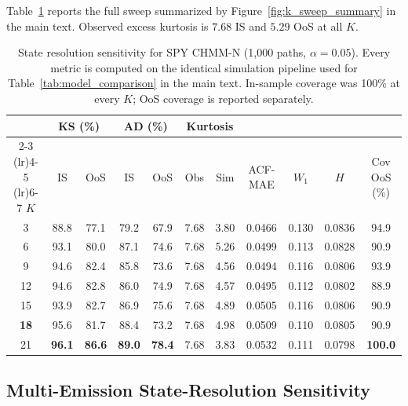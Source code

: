 Table~\ref{tab:sensitivity} reports the full sweep summarized by Figure~\ref{fig:k_sweep_summary} in the main text.
Observed excess kurtosis is $7.68$ IS and $5.29$ OoS at all $K$.

\begin{table}[H]
\centering
\caption{State resolution sensitivity for SPY CHMM-N (1{,}000 paths, $\alpha = 0.05$). Every metric is computed on the identical simulation pipeline used for Table~\ref{tab:model_comparison} in the main text. In-sample coverage was 100\% at every $K$; OoS coverage is reported separately.}
\label{tab:sensitivity}
\small
\begin{tabular}{c cc cc cc c c c c}
\toprule
& \multicolumn{2}{c}{KS (\%)} & \multicolumn{2}{c}{AD (\%)} & \multicolumn{2}{c}{Kurtosis} & & & & \\
\cmidrule(lr){2-3} \cmidrule(lr){4-5} \cmidrule(lr){6-7}
$K$ & IS & OoS & IS & OoS & Obs & Sim & ACF-MAE & $W_1$ & $H$ & Cov OoS (\%) \\
\midrule
3  & 88.8 & 77.1 & 79.2 & 67.9 & 7.68 & 3.80 & 0.0466 & 0.130 & 0.0836 & 94.9 \\
6  & 93.1 & 80.0 & 87.1 & 74.6 & 7.68 & 5.26 & 0.0499 & 0.113 & 0.0828 & 90.9 \\
9  & 94.6 & 82.4 & 85.8 & 73.6 & 7.68 & 4.56 & 0.0494 & 0.116 & 0.0806 & 93.9 \\
12 & 94.6 & 82.8 & 86.0 & 74.9 & 7.68 & 4.57 & 0.0495 & 0.112 & 0.0802 & 88.9 \\
15 & 93.9 & 82.7 & 86.9 & 75.6 & 7.68 & 4.89 & 0.0505 & 0.116 & 0.0806 & 90.9 \\
\textbf{18} & 95.6 & 81.7 & 88.4 & 73.2 & 7.68 & 4.98 & 0.0509 & 0.110 & 0.0805 & 90.9 \\
21 & \textbf{96.1} & \textbf{86.6} & \textbf{89.0} & \textbf{78.4} & 7.68 & 3.83 & 0.0532 & 0.111 & 0.0798 & \textbf{100.0} \\
\bottomrule
\end{tabular}
\end{table}

\subsection{Multi-Emission State-Resolution Sensitivity}
\label{sec:multi_emission_sensitivity}

